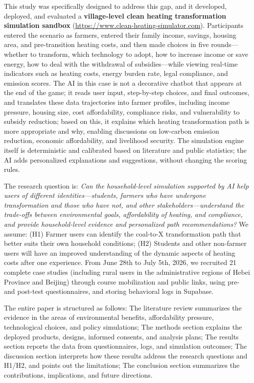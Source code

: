 \documentclass[stu,12pt,floatsintext,donotrepeattitle]{apa7}
\begin{document}
This study was specifically designed to address this gap, and it developed, deployed, and evaluated a \textbf{village-level clean heating transformation simulation sandbox} (\url{https://www.clean-heating-simulator.com}). Participants entered the scenario as farmers, entered their family income, savings, housing area, and pre-transition heating costs, and then made choices in five rounds---whether to transform, which technology to adopt, how to increase income or save energy, how to deal with the withdrawal of subsidies---while viewing real-time indicators such as heating costs, energy burden rate, legal compliance, and emission scores. The AI in this case is not a decorative chatbot that appears at the end of the game; it reads user input, step-by-step choices, and final outcomes, and translates these data trajectories into farmer profiles, including income pressure, housing size, cost affordability, compliance risks, and vulnerability to subsidy reduction; based on this, it explains which heating transformation path is more appropriate and why, enabling discussions on low-carbon emission reduction, economic affordability, and livelihood security. The simulation engine itself is deterministic and calibrated based on literature and public statistics; the AI adds personalized explanations and suggestions, without changing the scoring rules.

The research question is: \textit{Can the household-level simulation supported by AI help users of different identities---students, farmers who have undergone transformation and those who have not, and other stakeholders---understand the trade-offs between environmental goals, affordability of heating, and compliance, and provide household-level evidence and personalized path recommendations?} We assume: (H1) Farmer users can identify the coal-to-X transformation path that better suits their own household conditions; (H2) Students and other non-farmer users will have an improved understanding of the dynamic aspects of heating costs after one experience. From June 28th to July 5th, 2026, we recruited 21 complete case studies (including rural users in the administrative regions of Hebei Province and Beijing) through course mobilization and public links, using pre- and post-test questionnaires, and storing behavioral logs in Supabase.

The entire paper is structured as follows: The literature review summarizes the evidence in the areas of environmental benefits, affordability pressure, technological choices, and policy simulations; The methods section explains the deployed products, designs, informed consents, and analysis plans; The results section reports the data from questionnaires, logs, and simulation outcomes; The discussion section interprets how these results address the research questions and H1/H2, and points out the limitations; The conclusion section summarizes the contributions, implications, and future directions.
\end{document}
